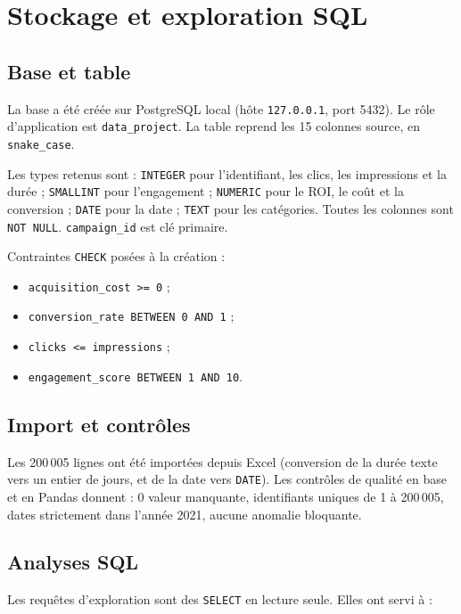 \chapter{Stockage et exploration SQL}
\label{chap:sql}

\section{Base et table}

La base  a été créée sur PostgreSQL local (hôte \texttt{127.0.0.1}, port 5432). Le rôle d'application est \texttt{data\_project}. La table  reprend les 15 colonnes source, en \texttt{snake\_case}.

Les types retenus sont : \texttt{INTEGER} pour l'identifiant, les clics, les impressions et la durée ; \texttt{SMALLINT} pour l'engagement ; \texttt{NUMERIC} pour le ROI, le coût et la conversion ; \texttt{DATE} pour la date ; \texttt{TEXT} pour les catégories. Toutes les colonnes sont \texttt{NOT NULL}. \texttt{campaign\_id} est clé primaire.

Contraintes \texttt{CHECK} posées à la création :

\begin{itemize}
\item \texttt{acquisition\_cost >= 0} ;
\item \texttt{conversion\_rate BETWEEN 0 AND 1} ;
\item \texttt{clicks <= impressions} ;
\item \texttt{engagement\_score BETWEEN 1 AND 10}.
\end{itemize}

\section{Import et contrôles}

Les 200\,005 lignes ont été importées depuis Excel (conversion de la durée texte vers un entier de jours, et de la date vers \texttt{DATE}). Les contrôles de qualité en base et en Pandas donnent : 0 valeur manquante, identifiants uniques de 1 à 200\,005, dates strictement dans l'année 2021, aucune anomalie bloquante.

\section{Analyses SQL}

Les requêtes d'exploration sont des \texttt{SELECT} en lecture seule. Elles ont servi à :

